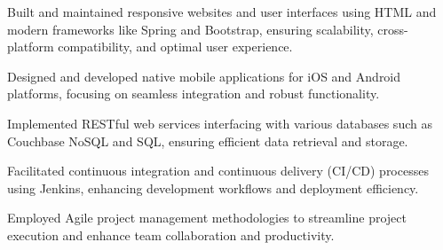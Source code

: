\begin{tightemize}
    \item Built and maintained responsive websites and user interfaces using HTML and modern frameworks like Spring and Bootstrap, ensuring scalability, cross-platform compatibility, and optimal user experience.

    \item Designed and developed native mobile applications for iOS and Android platforms, focusing on seamless integration and robust functionality.

    \item Implemented RESTful web services interfacing with various databases such as Couchbase NoSQL and SQL, ensuring efficient data retrieval and storage.

    \item Facilitated continuous integration and continuous delivery (CI/CD) processes using Jenkins, enhancing development workflows and deployment efficiency.

    \item Employed Agile project management methodologies to streamline project execution and enhance team collaboration and productivity.
\end{tightemize}